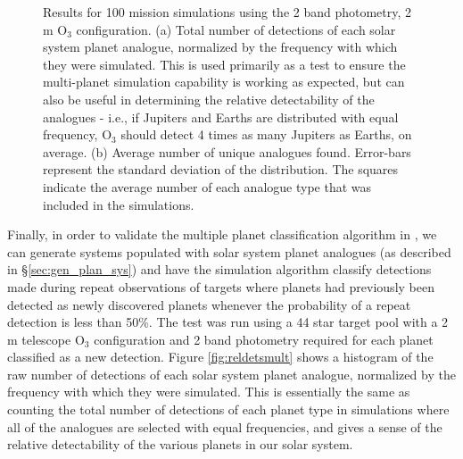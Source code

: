 \begin{figure}[ht]
 \centering
 \caption[Validation of Bayesian unique planet classification]{Results for 100 mission simulations using the 2 band photometry, 2 m O$_3$ configuration. (a) Total number of detections of each solar system planet analogue, normalized by the frequency with which they were simulated. This is used primarily as a test to ensure the multi-planet simulation capability is working as expected, but can also be useful in determining the relative detectability of the analogues - i.e., if Jupiters and Earths are distributed with equal frequency, O$_3$ should detect 4 times as many Jupiters as Earths, on average. (b) Average number of unique analogues found. Error-bars represent the standard deviation of the distribution. The squares indicate the average number of each analogue type that was included in the simulations.}
\end{figure}
Finally, in order to validate the multiple planet classification algorithm in , we can generate systems populated with solar system planet analogues (as described in \S\ref{sec:gen_plan_sys}) and have the simulation algorithm classify detections made during repeat observations of targets where planets had previously been detected as newly discovered planets whenever the probability of a repeat detection is less than 50\%.   The test was run using a 44 star target pool with a 2 m telescope O$_3$ configuration and 2 band photometry required for each planet classified as a new detection.  Figure \ref{fig:reldetsmult} shows a histogram of the raw number of detections of each solar system planet analogue, normalized by the frequency with which they were simulated.  This is essentially the same as counting the total number of detections of each planet type in simulations where all of the analogues are selected with equal frequencies, and gives a sense of the relative detectability of the various planets in our solar system. 

